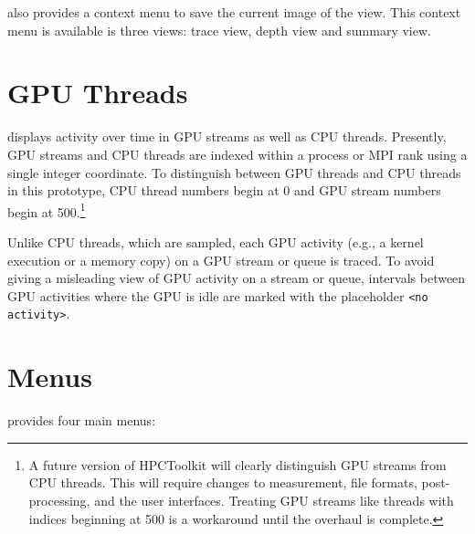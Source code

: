 

\hpctraceviewer{} also provides a context menu to save the current image of the view. 
This context menu is available is three views: trace view, depth view and summary view.


\section{GPU Threads}

\hpctraceviewer{} displays activity over time in GPU streams as well as CPU threads. Presently, GPU streams and CPU threads are indexed within a process or MPI rank using a single integer coordinate. To distinguish between GPU threads and CPU threads in this prototype, CPU thread numbers begin at 0 and GPU stream numbers begin at 500.\footnote{A future version of HPCToolkit will clearly distinguish GPU streams from CPU threads. This will require changes to measurement, file formats, post-processing, and the user interfaces. Treating GPU streams like threads with indices beginning at 500 is a workaround until the overhaul is complete.}

Unlike CPU threads, which are sampled, each GPU activity (e.g., a kernel execution or a memory copy)  on a GPU stream or queue is traced. To avoid giving a misleading view of GPU activity on a stream or queue, intervals between GPU activities where the GPU is idle are marked with the placeholder \verb|<no activity>|.




\section{Menus}

\hpcviewer{} provides four main menus:


